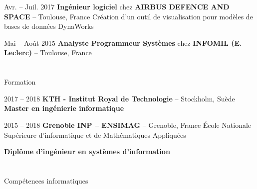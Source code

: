 \documentclass[a4paper, 10pt]{article}
\begin{document}
\begin{datedEntry}
    {Avr. -- Juil. 2017}
    {\textbf{Ingénieur logiciel} chez \textbf{AIRBUS DEFENCE AND SPACE} -- Toulouse, France}
    Création d’un outil de visualisation pour modèles de bases de données DynaWorks

    \smallskip
\end{datedEntry}

\begin{datedEntry}
    {Mai -- Août 2015}
    {\textbf{Analyste Programmeur Systèmes} chez \textbf{INFOMIL (E. Leclerc)} -- Toulouse, France}
\end{datedEntry}


\section{\faGraduationCap}{Formation}

\begin{datedEntry}
    {2017 -- 2018}
    {\textbf{KTH - Institut Royal de Technologie} -- Stockholm, Suède}
    \textbf{Master en ingénierie informatique}

    \smallskip
\end{datedEntry}

\begin{datedEntry}
    {2015 -- 2018}
    {\textbf{Grenoble INP -- ENSIMAG} -- Grenoble, France}
    École Nationale Supérieure d’informatique et de Mathématiques Appliquées

    \smallskip
    \textbf{Diplôme d’ingénieur en systèmes d’information}

    \smallskip
\end{datedEntry}


\section{\faLaptop}{Compétences informatiques}
\end{document}

